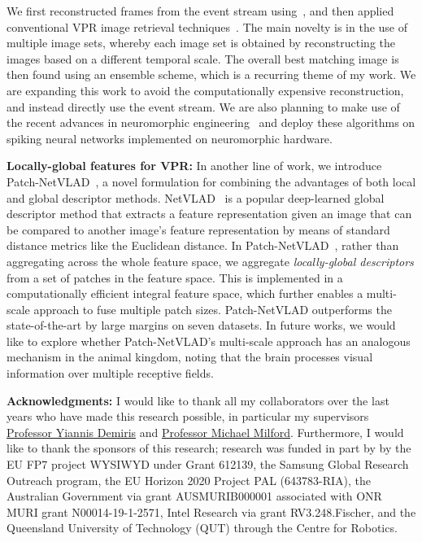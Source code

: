 \documentclass[conference]{IEEEtran}
\begin{document}
We first reconstructed frames from the event stream using~\cite{Rebecq19pami}, and then applied conventional VPR image retrieval techniques~\cite{Arandjelovic2018}. The main novelty is in the use of multiple image sets, whereby each image set is obtained by reconstructing the images based on a different temporal scale. The overall best matching image is then found using an ensemble scheme, which is a recurring theme of my work. We are expanding this work to avoid the computationally expensive reconstruction, and instead directly use the event stream. We are also planning to make use of the recent advances in neuromorphic engineering~\cite{davies2021advancing} and deploy these algorithms on spiking neural networks implemented on neuromorphic hardware.

\textbf{Locally-global features for VPR:} In another line of work, we introduce Patch-NetVLAD~\cite{Hausler2021}, a novel formulation for combining the advantages of both local and global descriptor methods. NetVLAD~\cite{Arandjelovic2018} is a popular deep-learned global descriptor method that extracts a feature representation given an image that can be compared to another image's feature representation by means of standard distance metrics like the Euclidean distance. In Patch-NetVLAD~\cite{Hausler2021}, rather than aggregating across the whole feature space, we aggregate \emph{locally-global descriptors} from a set of patches in the feature space. This is implemented in a computationally efficient integral feature space, which further enables a multi-scale approach to fuse multiple patch sizes. Patch-NetVLAD outperforms the state-of-the-art by large margins on seven datasets. In future works, we would like to explore whether Patch-NetVLAD's multi-scale approach has an analogous mechanism in the animal kingdom, noting that the brain processes visual information over multiple receptive fields.

\addtolength{\textheight}{-1cm}

\textbf{Acknowledgments:} I would like to thank all my collaborators over the last years who have made this research possible, in particular my supervisors \href{https://www.demiris.info}{Professor Yiannis Demiris} and \href{https://maththrills.com}{Professor Michael Milford}. Furthermore, I would like to thank the sponsors of this research; research was funded in part by by the EU FP7 project WYSIWYD under Grant 612139, the Samsung Global
Research Outreach program, the EU Horizon 2020 Project PAL (643783-RIA), the Australian Government via grant AUSMURIB000001 associated with ONR MURI grant N00014-19-1-2571, Intel Research via grant RV3.248.Fischer, and the Queensland University of Technology (QUT) through the Centre for Robotics.




\end{document}
